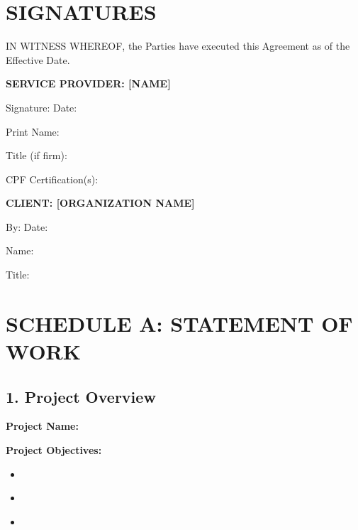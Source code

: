 \documentclass[11pt,a4paper]{article}
\begin{document}
\section*{SIGNATURES}

IN WITNESS WHEREOF, the Parties have executed this Agreement as of the Effective Date.

\vspace{2em}

\textbf{SERVICE PROVIDER: [NAME]}

\vspace{1.5em}

Signature: \underline{\hspace{6cm}} Date: \underline{\hspace{3cm}}

Print Name: \underline{\hspace{6cm}}

Title (if firm): \underline{\hspace{6cm}}

CPF Certification(s): \underline{\hspace{6cm}}

\vspace{2em}

\textbf{CLIENT: [ORGANIZATION NAME]}

\vspace{1.5em}

By: \underline{\hspace{6cm}} Date: \underline{\hspace{3cm}}

Name: \underline{\hspace{6cm}}

Title: \underline{\hspace{6cm}}

\newpage

\section*{SCHEDULE A: STATEMENT OF WORK}

\subsection*{1. Project Overview}

\textbf{Project Name:} \underline{\hspace{10cm}}

\textbf{Project Objectives:}
\begin{itemize}
\item[] \underline{\hspace{12cm}}
\item[] \underline{\hspace{12cm}}
\item[] \underline{\hspace{12cm}}
\end{itemize}
\end{document}
